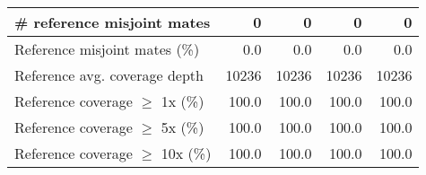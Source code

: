 \documentclass[12pt,a4paper]{article}
\begin{document}
\begin{table}[ht]
\begin{center}
\begin{tabular}{|l*{4}{|r}|}
\# reference misjoint mates & 0 & 0 & 0 & 0 \\ \hline
Reference misjoint mates (\%) & 0.0 & 0.0 & 0.0 & 0.0 \\ \hline
Reference avg. coverage depth & 10236 & 10236 & 10236 & 10236 \\ \hline
Reference coverage $\geq$ 1x (\%) & 100.0 & 100.0 & 100.0 & 100.0 \\ \hline
Reference coverage $\geq$ 5x (\%) & 100.0 & 100.0 & 100.0 & 100.0 \\ \hline
Reference coverage $\geq$ 10x (\%) & 100.0 & 100.0 & 100.0 & 100.0 \\ \hline
\end{tabular}
\end{center}
\end{table}
\end{document}
